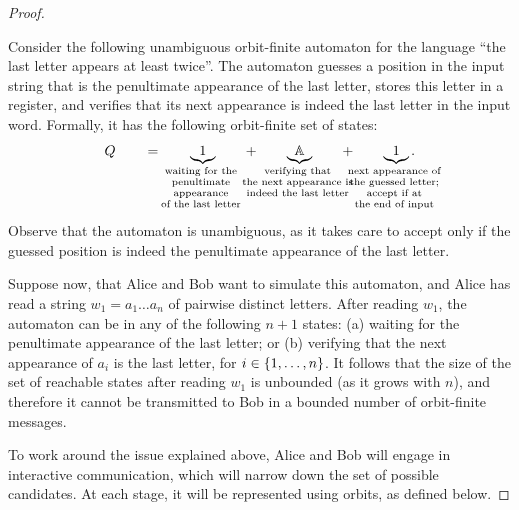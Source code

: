 \begin{proof}
\begin{myexample}
Consider the following unambiguous orbit-finite automaton for  the language ``the last letter appears at least twice''. The automaton guesses a position in the input string that is the penultimate appearance of the last letter, stores this letter in a register,
and verifies that its next appearance is indeed the last letter in the input word.
Formally, it has the following orbit-finite set of states:  
\begin{align*}
  Q \qquad = \qquad  \myunderbrace{1}{waiting for the\\ penultimate \\ appearance\\ of the last letter} \qquad +
      \qquad \myunderbrace{\atoms}{verifying that\\ the next appearance is\\ indeed the last letter}  \qquad + \qquad
      \myunderbrace{1}{next appearance of \\ the guessed letter; \\ accept if at \\ the end of input}.
\end{align*}
Observe that the automaton is unambiguous, as it takes care to accept only if the guessed position is indeed the penultimate appearance of the last letter.

Suppose now, that Alice and Bob want to simulate this automaton, and Alice has read a string $w_1 = a_1 \ldots a_n$ of pairwise distinct letters.
After reading $w_1$, the automaton can be in any  of the following $n+1$ states:
(a) waiting for the penultimate appearance of the last letter;
or (b) verifying that the next appearance of $a_i$ is the last letter, for $i \in \{1,\ldots,n\}$.
It follows that the size of the set of reachable states after reading $w_1$ is unbounded (as it grows with $n$),
and therefore it cannot be transmitted to Bob in a bounded number of orbit-finite messages.
\end{myexample}

To work around the issue explained above, Alice and Bob will engage in interactive communication, which will narrow down the set of possible candidates.
At each stage, it will be represented using orbits, as defined below.


\end{proof}
